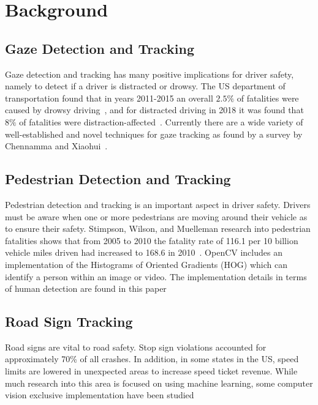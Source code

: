 \section{Background}
\subsection{Gaze Detection and Tracking}

Gaze detection and tracking has many positive implications for driver safety, namely to detect if a driver is distracted or drowsy. The US department of transportation found that in years 2011-2015 an overall $2.5\%$ of fatalities were caused by drowsy driving~\cite{CrashDrowsy}, and for distracted driving in 2018 it was found that $8\%$ of fatalities were distraction-affected~\cite{CrashDistracted}. Currently there are a wide variety of well-established and novel techniques for gaze tracking as found by a survey by Chennamma and Xiaohui~\cite{chennamma2013survey}. 

\subsection{Pedestrian Detection and Tracking}

Pedestrian detection and tracking is an important aspect in driver safety. Drivers must be aware when one or more pedestrians are moving around their vehicle as to ensure their safety. Stimpson, Wilson, and Muelleman research into pedestrian fatalities shows that from 2005 to 2010 the fatality rate of 116.1 per 10 billion vehicle miles driven had increased to 168.6 in 2010~\cite{PedestrianFatalities}.
OpenCV includes an implementation of the Histograms of Oriented Gradients (HOG) which can identify a person within an image or video.
The implementation details in terms of human detection are found in this paper\cite{HOGHumanDetection}

\subsection{Road Sign Tracking}
Road signs are vital to road safety. 
Stop sign violations accounted for approximately 70\% of all crashes. %
In addition, in some states in the US, speed limits are lowered in unexpected areas to increase speed ticket revenue. %
While much research into this area is focused on using machine learning, some computer vision exclusive implementation have been studied %